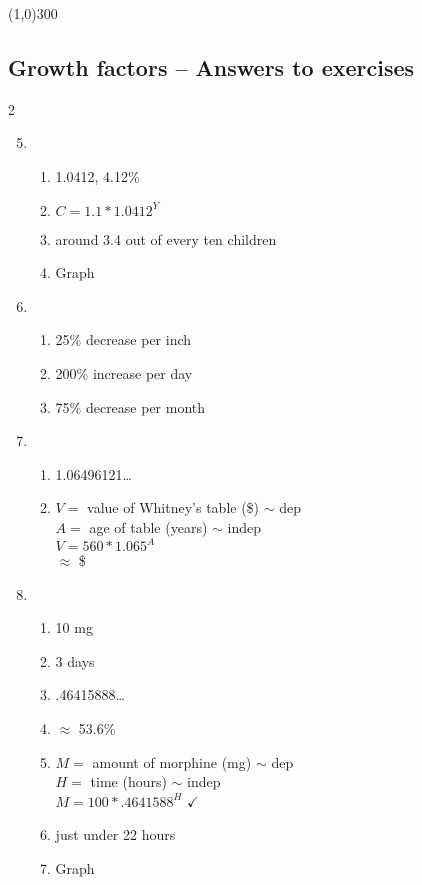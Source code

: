 \bigskip 

\begin{center}
\line(1,0){300} %
\end{center}

\subsection {Growth factors -- Answers to exercises} %

\begin{multicols} {2}
\begin{enumerate}
\setcounter{enumi}{4}

\item %
\begin{enumerate}
\item 1.0412, 4.12\%
\item $C=1.1 \ast 1.0412^Y$
\item around 3.4 out of every ten children
\item Graph
\end{enumerate}

\item 
\begin{enumerate}
\item %
25\% decrease per inch
\item %
200\% increase per day
\item %
75\% decrease per month 
\end{enumerate}

\item %
\begin{enumerate}
\item 1.06496121\ldots
\item $V=$ value of Whitney's table (\$) $\sim$ dep \\ $A=$ age of table (years) $\sim$ indep \\ $V=560 \ast 1.065^A$ \\ $\approx$ \$
\end{enumerate}

\item %
\begin{enumerate}
\item 10 mg
\item 3 days
\item .46415888\ldots
\item $\approx$ 53.6\% 
\item $M=$ amount of morphine (mg) $\sim$ dep \\ $H=$ time (hours) $\sim$ indep \\ $M = 100 \ast .4641588^H$ $\checkmark$
\item just under 22 hours
\item Graph
\end{enumerate}


\end{enumerate}
\end{multicols}
